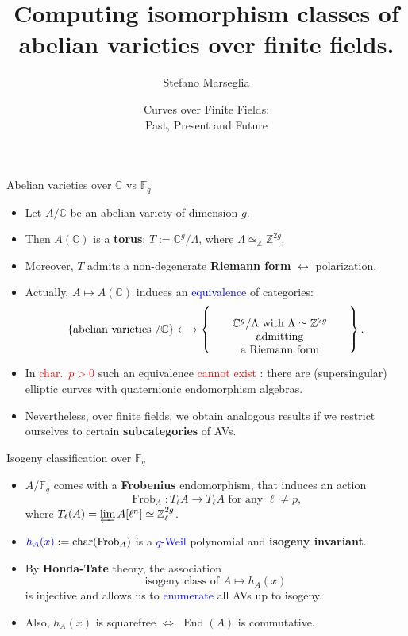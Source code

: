 \documentclass[usenames,dvipsnames,handout]{beamer}
\title[]{ Computing isomorphism classes of\\abelian varieties over finite fields. }
\subtitle{}
\author[Stefano Marseglia]{Stefano Marseglia}
\institute[]{Utrecht University}
\date[ 24/05/2021 ]{{\large Curves over Finite Fields:}\\Past, Present and Future}
\def\Z{\mathbb{Z}}
\def\C{\mathbb{C}}
\def\F{\mathbb{F}}
\DeclareMathOperator{\Char}{char}
\DeclareMathOperator{\Frob}{Frob}
\DeclareMathOperator{\End}{End}
\newcommand{\set}[1]{\left\lbrace#1\right\rbrace }
\newcommand{\red}[1]{\textcolor{red}{#1}}
\newcommand{\blue}[1]{\textcolor{blue}{#1}}
\begin{document}

\begin{frame}
\titlepage
\end{frame}

\begin{frame}{ Abelian varieties over $\C$ vs $\F_q$ }    
    \begin{itemize}
     \item Let $A/\C$ be an abelian variety of dimension $g$. 
\pause
    \item Then $A(\C)$ is a {\bf torus}: $T:=\C^g/\Lambda$, where $\Lambda\simeq_\Z\Z^{2g}$.
\pause 
    \item Moreover, $T$ admits a non-degenerate {\bf Riemann form} $\longleftrightarrow$ polarization.
\pause
    \item Actually, $ A \mapsto A(\C)$ induces an \blue{equivalence} of categories:
	  \[
      \set{ \text{abelian varieties $/\C$} } \longleftrightarrow 
      \set{\parbox[c]{12.5em}{\center $\C^g/\Lambda$ with $\Lambda\simeq \Z^{2g}$ admitting\\ a Riemann form}}.
     \]
\pause
    \item In \red{char.~$p>0$} such an equivalence \red{cannot exist} : there are (supersingular) elliptic curves with quaternionic endomorphism algebras.
\pause 
    \item Nevertheless, over finite fields, we obtain analogous results if we restrict ourselves to certain {\bf subcategories} of AVs.
	\end{itemize}
\end{frame}

\begin{frame}{ Isogeny classification over $\F_q$}
	\begin{itemize}
    \item $A/\F_{q}$ comes with a {\bf Frobenius} endomorphism, 
\pause
    that induces an action
		\[ \Frob_A : T_\ell A \rightarrow T_\ell A \text{ for any }\ell\neq p, \]
		where $T_\ell(A) = \varprojlim A[\ell^n] \simeq \Z_\ell^{2g}$.
\pause 
    \item $\blue{h_A(x)}:=\Char(\Frob_A)$ is a \blue{$q$-Weil} polynomial and {\bf isogeny invariant}.
\pause
    \item By {\bf Honda-Tate} theory, the association
		\[ \text{isogeny class of }A \longmapsto h_A(x) \]
		is injective and allows us to \blue{enumerate} all AVs up to isogeny.
\pause
    \item Also, $h_A(x)$ is squarefree $\iff$ $\End(A)$ is commutative.
	\end{itemize}
\end{frame}
\end{document}

